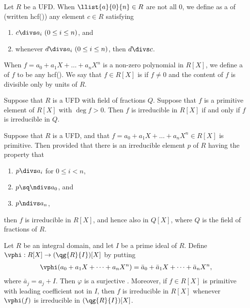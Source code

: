 \documentclass{article}
\begin{document}
  \begin{tdefinition}
    Let $ R $ be a UFD.
    When $ \llist{a}{0}{n}\in R $ are not all 0, we define as a  of  (written hcf()) any element $ c\in R $ satisfying \begin{enumerate}[label=(\roman*)]
      \item $ c\divs a_i\ (0\leq i\leq n) $, and
      \item whenever $ d\divs a_i\ (0\leq i\leq n) $, then $ d\divs c $.
    \end{enumerate}
    When $ f=a_0+a_1X+\ldots +a_nX^n $ is a non-zero polynomial in $ R[X] $, we define a  of $ f $ to be any hcf().
    We say that $ f\in R[X] $ is  if $ f\neq 0 $ and the content of $ f $ is divisible only by units of $ R $.
  \end{tdefinition}

  \begin{ttheorem}
    Suppose that $ R $ is a UFD with field of fractions $ Q $.
    Suppose that $ f $ is a primitive element of $ R[X] $ with $ \deg f > 0 $.
    Then $ f $ is irreducible in $ R[X] $ if and only if $ f $ is irreducible in $ Q $.
  \end{ttheorem}

  \begin{ttheorem}
    Suppose that $ R $ is a UFD, and that $ f=a_0+a_1X+\ldots +a_nX^n \in R[X] $ is primitive.
    Then provided that there is an irreducible element $ p $ of $ R $ having the property that \begin{enumerate}[label=(\roman*)]
      \item $ p\divs a_i $ for $ 0\leq i < n $,
      \item $ p\sq \ndivs a_0 $, and
      \item $ p\ndivs a_n $,
    \end{enumerate}
    then $ f $ is irreducible in $ R[X] $, and hence also in $ Q[X] $, where $ Q $ is the field of fractions of $ R $.
  \end{ttheorem}

  \begin{ttheorem}
    Let $ R $ be an integral domain, and let $ I $ be a prime ideal of $ R $.
    Define $ \vphi:R[X]\to (\qg{R}{I})[X] $ by putting \begin{align*}
      \vphi(a_0+a_1X+\cdots+a_nX^n) =\bar a_0+\bar a_1X+\cdots+\bar a_nX^n,
    \end{align*}
    where $ \bar a_j = a_j + I $.
    Then $ \varphi $ is a surjective \homo.
    Moreover, if $ f\in R[X] $ is primitive with leading coefficient not in $ I $, then $ f $ is irreducible in $ R[X] $ whenever $ \vphi(f) $ is irreducible in $ (\qg{R}{I})[X] $.
  \end{ttheorem}
\end{document}
